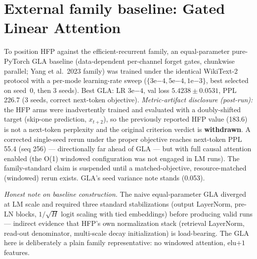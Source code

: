 \documentclass[11pt,a4paper]{article}
\begin{document}
\section{External family baseline: Gated Linear Attention}
To position HFP against the efficient-recurrent family, an equal-parameter
pure-PyTorch GLA baseline (data-dependent per-channel forget gates, chunkwise
parallel; Yang et al.\ 2023 family) was trained under the identical WikiText-2
protocol with a per-mode learning-rate sweep ($\{3\mathrm{e}{-4},
5\mathrm{e}{-4}, 1\mathrm{e}{-3}\}$, best selected on seed~0, then 3 seeds).
Best GLA: LR $3\mathrm{e}{-4}$, val loss $5.4238 \pm 0.0531$, PPL 226.7
(3 seeds, correct next-token objective). \emph{Metric-artifact disclosure
(post-run):} the HFP arms were inadvertently trained and evaluated with a
doubly-shifted target (skip-one prediction, $x_{t+2}$), so the previously
reported HFP value (183.6) is not a next-token perplexity and the original
criterion verdict is \textbf{withdrawn}. A corrected single-seed rerun under
the proper objective reaches next-token PPL 55.4 (seq 256) --- directionally
far ahead of GLA --- but with full causal attention enabled (the O(1) windowed
configuration was not engaged in LM runs). The family-standard claim is
suspended until a matched-objective, resource-matched (windowed) rerun exists.
GLA's seed variance note stands (0.053).

\emph{Honest note on baseline construction.} The naive equal-parameter GLA
diverged at LM scale and required three standard stabilizations (output
LayerNorm, pre-LN blocks, $1/\sqrt{H}$ logit scaling with tied embeddings)
before producing valid runs --- indirect evidence that HFP's own
normalization stack (retrieval LayerNorm, read-out denominator, multi-scale
decay initialization) is load-bearing. The GLA here is deliberately a plain
family representative: no windowed attention, elu$+1$ features.
\end{document}
